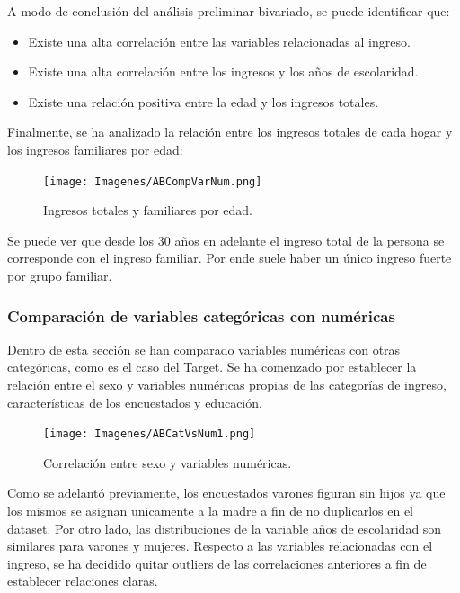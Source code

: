 \documentclass[a4paper]{article}
\begin{document}
        A modo de conclusión del análisis preliminar bivariado, se puede identificar que:
        \begin{itemize}
            \item Existe una alta correlación entre las variables relacionadas al ingreso.
            \item Existe una alta correlación entre los ingresos y los años de escolaridad.
            \item Existe una relación positiva entre la edad y los ingresos totales.
        \end{itemize}
        
 \vspace{1cm}
 
            Finalmente, se ha analizado la relación entre los ingresos totales de cada hogar y los ingresos familiares por edad:
            \begin{figure}[H]
                \centering
                \texttt{[image: Imagenes/ABCompVarNum.png]}
                \caption{Ingresos totales y familiares por edad.}
                \label{AB Income and age relationship}
            \end{figure}
 
            Se puede ver que desde los 30 años en adelante el ingreso total de la persona se corresponde con el ingreso familiar. Por ende suele haber un único ingreso fuerte por grupo familiar.
 
        \subsubsection{Comparación de variables categóricas con numéricas}
 
            Dentro de esta sección se han comparado variables numéricas con otras categóricas, como es el caso del Target. Se ha comenzado por establecer la relación entre el sexo y variables numéricas propias de las categorías de ingreso, características de los encuestados y educación.
 
            \begin{figure}[H]
                \centering
                \texttt{[image: Imagenes/ABCatVsNum1.png]}
                \caption{Correlación entre sexo y variables numéricas.}
                \label{AB genre and numeric variables}
            \end{figure}
 
            Como se adelantó previamente, los encuestados varones figuran sin hijos ya que los mismos se asignan unicamente a la madre a fin de no duplicarlos en el dataset. Por otro lado, las distribuciones de la variable años de escolaridad son similares para varones y mujeres.
            Respecto a las variables relacionadas con el ingreso, se ha decidido quitar outliers de las correlaciones anteriores a fin de establecer relaciones claras.
 
\end{document}
